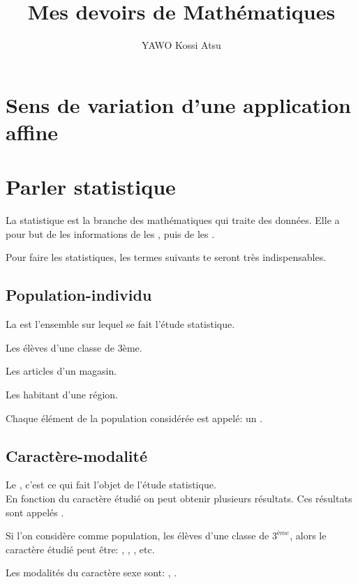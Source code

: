 \documentclass[12pt,a4paper]{report}
\author{YAWO Kossi Atsu}
\title{Mes devoirs de Mathématiques}
\begin{document}
\dominitoc

\tableofcontents
\chapter{Sens de variation d'une application affine}

\chapter{Parler statistique}
La statistique est la branche des mathématiques qui traite des données. Elle a pour but de  les informations de les , puis de les .
\par
Pour faire les statistiques, les termes suivants te seront très indispensables.

\section{Population-individu}
La  est l'ensemble sur lequel se fait l'étude statistique.\\

\begin{exemples}
\item Les élèves d'une classe de 3ème.
\item Les articles d'un magasin.
\item Les habitant d'une région.
\end{exemples}

Chaque élément de la population considérée est appelé: un .

\section{Caractère-modalité}
Le , c'est ce qui fait l'objet de l'étude statistique.\\
En fonction du caractère étudié on peut obtenir plusieurs résultats. Ces résultats sont appelés .

\begin{exemples}
\item Si l'on considère comme population, les élèves d'une classe de $3^{ème}$, alors le caractère étudié peut être: , , , etc.
\item Les modalités du caractère sexe sont: , .
\end{exemples}
\end{document}
